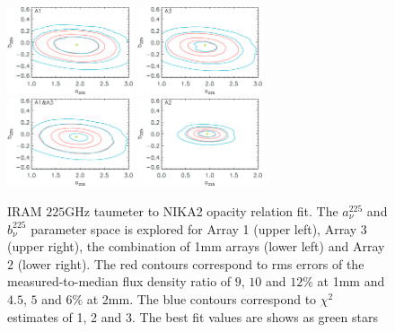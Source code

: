 \begin{figure}[ht!]
  \begin{center}
    \includegraphics[clip=true, trim={0, -0.3cm, -0.3cm, 0}, width=0.33\textwidth]{Figures/Opacity/fit_nika2_tau_from_taumeter_mwc349_a1.pdf}
    \includegraphics[clip=true, trim={0, -0.3cm, -0.3cm, 0}, width=0.33\textwidth]{Figures/Opacity/fit_nika2_tau_from_taumeter_mwc349_a3.pdf}
    \includegraphics[clip=true, trim={0, -0.3cm, -0.3cm, 0}, width=0.33\textwidth]{Figures/Opacity/fit_nika2_tau_from_taumeter_mwc349_1mm.pdf}
    \includegraphics[clip=true, trim={0, -0.3cm, -0.3cm, 0}, width=0.33\textwidth]{Figures/Opacity/fit_nika2_tau_from_taumeter_mwc349_a2.pdf}
    \caption[IRAM taumeter to NIKA2 opacity model]{IRAM $225$GHz taumeter to
    NIKA2 opacity relation fit.
    The $a_{\nu}^{225}$ and
    $b_{\nu}^{225}$ parameter space is explored for Array 1 (upper left),
    Array 3 (upper right), the combination of 1mm arrays (lower left)
    and Array 2 (lower right).
    The red contours correspond to rms
    errors of the measured-to-median flux density ratio of $9$, $10$
    and $12\%$ at 1mm and $4.5$, $5$ and $6\%$ at 2mm. The blue
    contours correspond to $\chi^2$ estimates of 1, 2 and 3.
    The best fit values are shows as green stars} 
\label{fig:taumeter_fit}
\end{center}
\end{figure}






